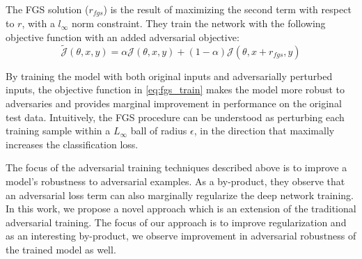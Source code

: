 The FGS solution ($r_{fgs}$) is the result of maximizing the second term with respect to $r$, with a $l_{\infty}$ norm constraint. They train the network with the following objective function with an added adversarial objective:
\begin{equation}
\tilde{\mathcal{J}}(\theta,x,y) = \alpha \mathcal{J}(\theta,x,y)+ (1-\alpha) \mathcal{J}(\theta,x+r_{fgs},y)
\label{eq:fgs_train}
\end{equation}


By training the model with both original inputs and adversarially perturbed inputs, the objective function in \ref{eq:fgs_train} makes the model more robust to adversaries and provides marginal improvement in performance on the original test data. Intuitively, the FGS procedure can be understood as perturbing each training sample within a $L_{\infty}$ ball of radius $\epsilon$, in the direction that maximally increases the classification loss. 


The focus of the adversarial training techniques described above is to improve a model's robustness to adversarial examples. As a by-product, they observe that an adversarial loss term can also marginally regularize the deep network training. In this work, we propose a novel approach which is an extension of the traditional adversarial training. The focus of our approach is to improve regularization and as an interesting by-product, we observe improvement in adversarial robustness of the trained model as well.

